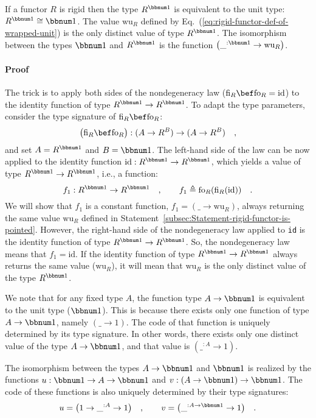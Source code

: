 If a functor $R$ is rigid then the type $R^{\bbnum 1}$ is equivalent
to the unit type: $R^{\bbnum 1}\cong\bbnum 1$. The value $\text{wu}_{R}$
defined by Eq.~(\ref{eq:rigid-functor-def-of-wrapped-unit}) is the
only distinct value of type $R^{\bbnum 1}$. The isomorphism between
the types $\bbnum 1$ and $R^{\bbnum 1}$ is the function $\left(\_^{:\bbnum 1}\rightarrow\text{wu}_{R}\right)$.

\paragraph{Proof}

The trick is to apply both sides of the nondegeneracy law ($\text{fi}_{R}\bef\text{fo}_{R}=\text{id}$)
to the identity function of type $R^{\bbnum 1}\rightarrow R^{\bbnum 1}$.
To adapt the type parameters, consider the type signature of $\text{fi}_{R}\bef\text{fo}_{R}$:
\[
\big(\text{fi}_{R}\bef\text{fo}_{R}\big):(A\rightarrow R^{B})\rightarrow(A\rightarrow R^{B})\quad,
\]
and set $A=R^{\bbnum 1}$ and $B=\bbnum 1$. The left-hand side of
the law can be now applied to the identity function $\text{id}:R^{\bbnum 1}\rightarrow R^{\bbnum 1}$,
which yields a value of type $R^{\bbnum 1}\rightarrow R^{\bbnum 1}$,
i.e., a function:
\[
f_{1}:R^{\bbnum 1}\rightarrow R^{\bbnum 1}\quad,\quad\quad f_{1}\triangleq\text{fo}_{R}(\text{fi}_{R}(\text{id}))\quad.
\]
We will show that $f_{1}$ is a constant function, $f_{1}=(\_\rightarrow\text{wu}_{R})$,
always returning the same value $\text{wu}_{R}$ defined in Statement~\ref{subsec:Statement-rigid-functor-is-pointed}.
However, the right-hand side of the nondegeneracy law applied to \lstinline!id!
is the identity function of type $R^{\bbnum 1}\rightarrow R^{\bbnum 1}$.
So, the nondegeneracy law means that $f_{1}=\text{id}$. If the identity
function of type $R^{\bbnum 1}\rightarrow R^{\bbnum 1}$ always returns
the same value ($\text{wu}_{R}$), it will mean that $\text{wu}_{R}$
is the only distinct value of the type $R^{\bbnum 1}$.

We note that for any fixed type $A$, the function type $A\rightarrow\bbnum 1$
is equivalent to the unit type ($\bbnum 1$). This is because there
exists only one function of type $A\rightarrow\bbnum 1$, namely $(\_\rightarrow1)$.
The code of that function is uniquely determined by its type signature.
In other words, there exists only one distinct value of the type $A\rightarrow\bbnum 1$,
and that value is $(\_^{:A}\rightarrow1)$. 

The isomorphism between the types $A\rightarrow\bbnum 1$ and $\bbnum 1$
is realized by the functions $u:\bbnum 1\rightarrow A\rightarrow\bbnum 1$
and $v:\left(A\rightarrow\bbnum 1\right)\rightarrow\bbnum 1$. The
code of these functions is also uniquely determined by their type
signatures:
\[
u=\big(1\rightarrow\_^{:A}\rightarrow1\big)\quad,\quad\quad v=\big(\_^{:A\rightarrow\bbnum 1}\rightarrow1\big)\quad.
\]

